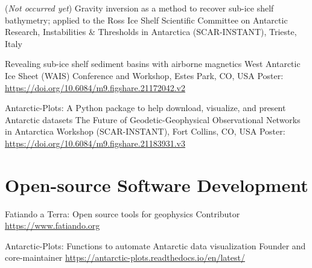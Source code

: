 \documentclass{ExpressiveResume}
\begin{document}
\begin{cventries}

    {(\textit{Not occurred yet}) Gravity inversion as a method to recover sub-ice shelf bathymetry; applied to the Ross Ice Shelf}
    {Scientific Committee on Antarctic Research, Instabilities \&
        Thresholds in Antarctica (SCAR-INSTANT), Trieste, Italy}
    {}
    {}




    {Revealing sub-ice shelf sediment basins with airborne magnetics}
    {West Antarctic Ice Sheet (WAIS) Conference and Workshop, Estes Park, CO, USA}
    {Poster: \url{https://doi.org/10.6084/m9.figshare.21172042.v2}}
    {}
    {}

    {Antarctic-Plots: A Python package to help download, visualize, and present Antarctic datasets}
    {The Future of Geodetic-Geophysical Observational Networks in
        Antarctica Workshop (SCAR-INSTANT), Fort Collins, CO, USA}
    {Poster: \url{https://doi.org/10.6084/m9.figshare.21183931.v3}}
    {}
    {}

\end{cventries}


\section{Open-source Software Development}

\begin{cventries}
    {Fatiando a Terra: Open source tools for geophysics}
    {Contributor \newline \url{https://www.fatiando.org}}
\end{cventries}

\begin{cventries}
    {Antarctic-Plots: Functions to automate Antarctic data visualization}
    {Founder and core-maintainer \newline \url{https://antarctic-plots.readthedocs.io/en/latest/}}
\end{cventries}
\end{document}
